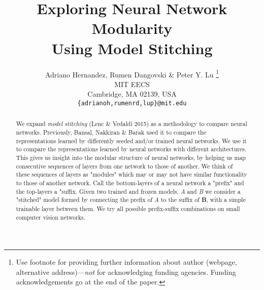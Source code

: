 \documentclass{article} %
\title{Exploring Neural Network Modularity \\ Using Model Stitching}
\author{Adriano Hernandez, Rumen Dangovski \& Peter Y. Lu \thanks{ Use footnote for providing further information
about author (webpage, alternative address)---\emph{not} for acknowledging
funding agencies.  Funding acknowledgements go at the end of the paper.} \\
MIT EECS\\
Cambridge, MA 02139, USA \\
\texttt{\{adrianoh,rumenrd,lup\}@mit.edu}
}
\begin{document}
\maketitle

\begin{abstract}
We expand \textit{model stitching} (Lenc \& Vedaldi 2015) as a methodology to compare neural networks. Previously, Bansal, Nakkiran \& Barak used it to compare the representations learned by differently seeded and/or trained neural networks. We use it to compare the representations learned by neural networks with different architectures. This gives us insight into the modular structure of neural networks, by helping us map consecutive sequences of layers from one network to those of another. We think of these sequences of layers as "modules" which may or may not have similar functionality to those of another network. Call the bottom-layers of a neural network a "prefix" and the top-layers a "suffix. Given two trained and frozen models, \textit{A} and \textit{B} we consider a "stitched" model formed by connecting the prefix of \textit{A} to the suffix of \textbf{B}, with a simple trainable layer between them. We try all possible prefix-suffix combinations on small computer vision networks.
\end{abstract}
\end{document}
